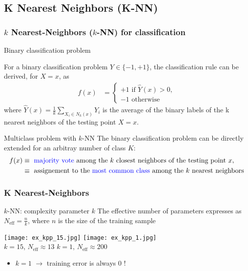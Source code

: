 \subsection{K Nearest Neighbors (K-NN)}

\begin{frame}
  \frametitle{$k$  Nearest-Neighbors ($k$-NN) for classification }


  \begin{block}{Binary classification problem}

  For a binary classification problem $Y\in \{-1,+1\}$,
  the classification rule can be derived, for $X=x$, as
  \begin{align*}
     f(x) &= \begin{cases}
                +1 \textrm{ if } \widehat{Y}(x) > 0,\\
                -1 \textrm{ otherwise}
             \end{cases}
  \end{align*}
  where $\widehat{Y}(x) = \frac{1}{k} \sum_{X_i \in N_k(x) } Y_i$ is the average  of the binary labels of the k nearest neighbors of the testing point $X=x$.
  \end{block}
  
  
  \begin{block}{Multiclass problem with $k$-NN}
  The binary classification problem can be directly extended for an arbitray number of class $K$:
  \begin{align*}
   f(x) & \equiv \text{ {\textcolor{blue}{majority vote}} among the $k$ closest neighbors of the testing point $x$},\\
   & \equiv   \text{ assignement to the {\textcolor{blue}{most common class}}  among the $k$ nearest neighbors}
  \end{align*}
  \end{block}


\end{frame}


\begin{frame}
  \frametitle{K Nearest-Neighbors}
\begin{block}{$k$-NN: complexity parameter $k$}
      The effective number of parameters expresses as $N_{\textrm{eff}} = \frac{n}{k}$,
      where $n$ is the size of the training sample
  \end{block}

  \begin{center}
    \texttt{[image: ex\_kpp\_15.jpg]}
  \quad
    \texttt{[image: ex\_kpp\_1.jpg]}\\
    $k=15$, $N_{\textrm{eff}} \approx 13$ \hspace{3cm} $k=1$, $N_{\textrm{eff}} \approx 200$
  \end{center}
  \begin{itemize}
     \item $k=1$ $\rightarrow$ training error is always $0$ !
  \end{itemize}

\end{frame}


